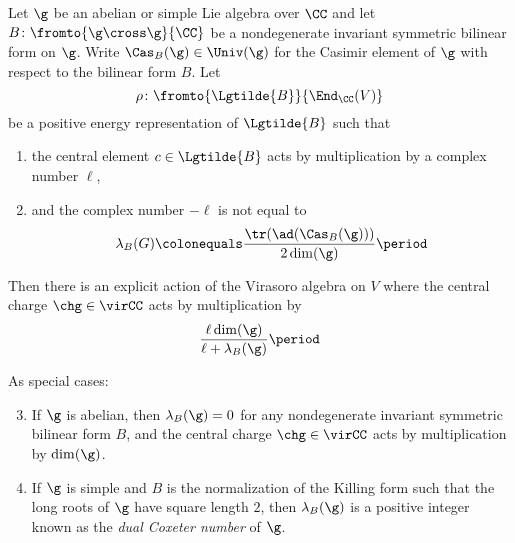 \begin{theorem}\label{thm:SegalSugawaravague}
	Let $ \g $ be an abelian or simple Lie algebra over $ \CC $ and let $ B \colon \fromto{\g \cross \g}{\CC} $ be
	a nondegenerate invariant symmetric bilinear form on $ \g $.
	Write $ \Cas_B(\g) \in \Univ(\g) $ for the Casimir element of $ \g $ with respect to the bilinear form $ B
	$.
	Let
	\begin{equation*}
		\rho \colon \fromto{\Lgtilde{B}}{\End_{\CC}(V)}
	\end{equation*} 
	be a positive energy representation of $ \Lgtilde{B} $ such that
	\begin{enumerate}
		\item the central element $ c \in \Lgtilde{B} $ acts by multiplication by a complex number $ \ell $,

		\item and the complex number $ -\ell $ is not equal to
		\begin{equation*}
			\lambda_B(G) \colonequals \frac{\tr(\ad(\Cas_{B}(\g)))}{2\dim(\g)} \period
		\end{equation*}
	\end{enumerate}
	Then there is an explicit action of the Virasoro algebra on $ V $ where the central charge $ \chg \in \virCC $
	acts by multiplication by
	\begin{equation*}
		\frac{\ell \dim(\g)}{\ell + \lambda_B(\g)} \period
	\end{equation*}

	As special cases:
	\begin{enumerate}
		\setcounter{enumi}{2}
		\item If $ \g $ is abelian, then $ \lambda_B(\g) = 0 $ for any nondegenerate invariant symmetric bilinear form $ B $, and the central charge $ \chg \in \virCC $ acts by multiplication by $ \dim(\g) $.

		\item If $ \g $ is simple and $ B $ is the normalization of the Killing form such that the long roots of $
		\g $ have square length $ 2 $, then $ \lambda_B(\g) $ is a positive integer known as the \emph{dual Coxeter
		number} of $ \g $.
	\end{enumerate}
\end{theorem}

